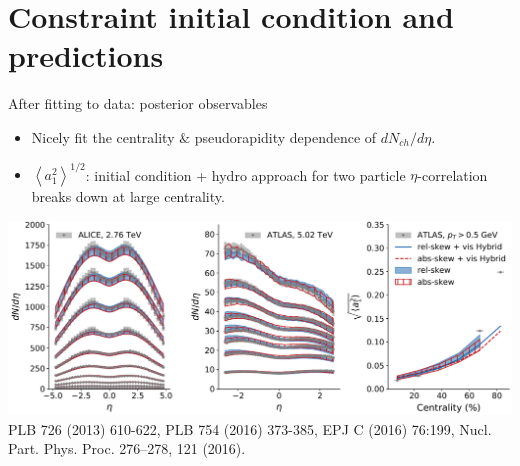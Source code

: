 \documentclass[11pt]{beamer}
\begin{document}
\section{Constraint initial condition and predictions}
\begin{frame}{After fitting to data: posterior observables}
\begin{itemize}
\item Nicely fit the centrality $\&$ pseudorapidity dependence of $dN_{ch}/d\eta$.
\item $\left\langle a_1^2\right\rangle^{1/2}$: initial condition + hydro approach for two particle $\eta$-correlation breaks down at large centrality.
\end{itemize}
\includegraphics[width=\textwidth]{post_obs.pdf}\\
\tiny  	PLB 726 (2013) 610-622, PLB 754 (2016) 373-385, EPJ C (2016) 76:199, Nucl. Part. Phys. Proc. 276–278, 121 (2016).
\end{frame}
\end{document}
